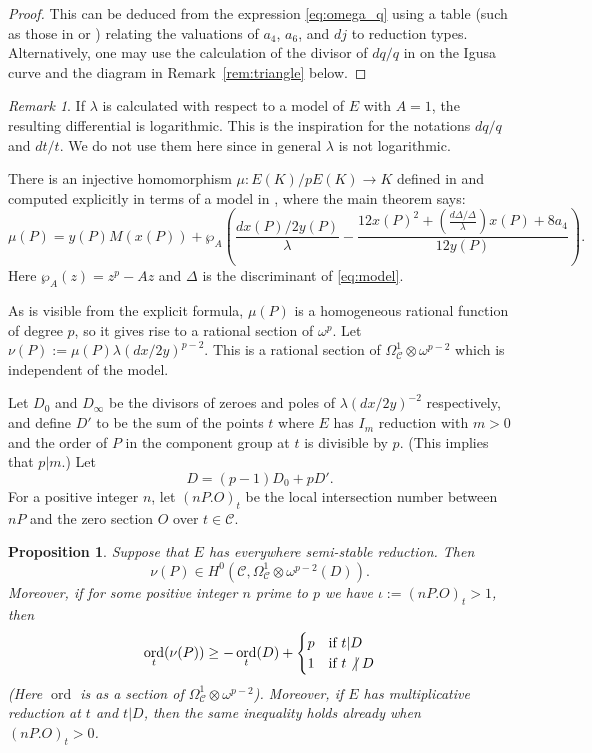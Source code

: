 \documentclass[12pt,reqno]{amsart}
\numberwithin{equation}{section}
\theoremstyle{plain}
\newtheorem{prop}[subsection]{Proposition}
\theoremstyle{definition}
\theoremstyle{remark}
\newtheorem{rem}[subsection]{Remark}
\newcommand{\CC}{\mathcal{C}}
\newcommand{\<}{\langle}
\renewcommand{\>}{\rangle}
\newcommand{\tensor}{\otimes}
\newcommand{\nodiv}{\not|}
\def\nodiv{\mathrel{\mathchoice{\not|}{\not|}{\kern-.2em\not\kern.2em|}
{\kern-.2em\not\kern.2em|}}}
\DeclareMathOperator{\ord}{ord}
\numberwithin{equation}{section}
\begin{document}
\begin{proof}
  This can be deduced from the expression \eqref{eq:omega_q} using a
  table (such as those in \cite[p.~540]{MirandaPersson86} or
  \cite[p.~41]{MirandaBTES}) relating the valuations of $a_4$, $a_6$,
  and $dj$ to reduction types.  Alternatively, one may use the
  calculation of the divisor of $dq/q$ in \cite[\S7]{Ulmer91} on the
  Igusa curve and the diagram in Remark~\ref{rem:triangle} below.
\end{proof}

\begin{rem}
  If $\lambda$ is calculated with respect to a model of $E$ with $A=1$,
  the resulting differential is logarithmic.  This is the inspiration
  for the notations $dq/q$ and $dt/t$.  We do not use them here since in
  general $\lambda$ is not logarithmic.
\end{rem}

There is an injective homomorphism $\mu:E(K)/pE(K)\to K$ defined in
\cite{Voloch90} and computed explicitly in terms of a model in
\cite{Broumas97}, where the main theorem says:
\begin{equation}\label{eq:Broumas}
  \mu(P)=y(P)M(x(P))+
  \wp_A\left(\frac{dx(P)/2y(P)}{\lambda}
    -\frac{12x(P)^2+\left(\frac{d\Delta/\Delta}{\lambda}\right)x(P)
      +8 a_4}{12y(P)}\right).
\end{equation}
Here $\wp_A(z)=z^p-Az$ and $\Delta$ is the discriminant of
\eqref{eq:model}.

As is visible from the explicit formula, $\mu(P)$ is a homogeneous
rational function of degree $p$, so it gives rise to a rational
section of $\omega^p$.  Let $\nu(P):=\mu(P)\lambda(dx/2y)^{p-2}$.
This is a rational section of $\Omega^1_{\CC}\tensor\omega^{p-2}$
which is independent of the model.

Let $D_0$ and $D_\infty$ be the divisors of zeroes and poles of
$\lambda(dx/2y)^{-2}$ respectively, and define $D'$ to be the sum of
the points $t$ where $E$ has $I_m$ reduction with $m>0$ and the
order of $P$ in the component group at $t$ is divisible by $p$. (This
implies that $p|m$.)  Let
\[D=(p-1)D_0+pD'.\]
For a positive integer $n$, let $(nP.O)_t$ be the local intersection
number between $nP$ and the zero section $O$ over $t\in\CC$. 

\begin{prop}\label{prop:bound1}
  Suppose that $E$ has everywhere semi-stable reduction.  Then
  \[\nu(P)\in H^0(\CC,\Omega^1_\CC\tensor\omega^{p-2}(D)).\]
  Moreover, if for some positive integer $n$ prime to $p$ we have
  $\iota:=(nP.O)_t>1$, then
  \[\ord_t(\nu(P))\ge
    -\ord_t(D)+
    \begin{cases}
      p&\text{if $t|D$}\\
      1&\text{if $t\nodiv D$}
    \end{cases}
  \]
  \textup{(}Here $\ord$ is as a section of
  $\Omega^1_\CC\tensor\omega^{p-2}$\textup{)}.  Moreover, if $E$ has
  multiplicative reduction at $t$ and $t|D$, then the same inequality
  holds already when $(nP.O)_t>0$.
\end{prop}
\end{document}
